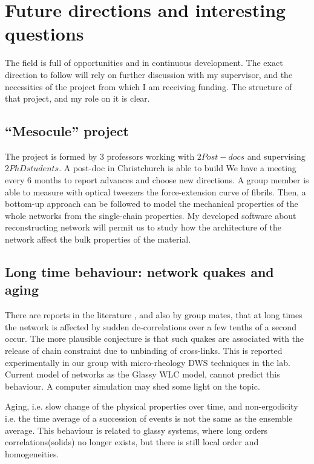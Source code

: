 \section{Future directions and interesting questions}

The field is full of opportunities and in continuous development. The exact
direction to follow will rely on further discussion with my supervisor, and the necessities
of the project from which I am receiving funding. The structure of that project,
and my role on it is clear.

\subsection{``Mesocule'' project}
The project is formed by $3$ professors working with $2 Post-docs$
and supervising $2 PhD students$. A post-doc in Christchurch is able to build We
have a meeting every $6$ months to report advances and choose new directions. A group
member is able to measure with optical tweezers the force-extension curve of
fibrils. Then, a bottom-up approach can be
followed\citep{schuster_investigating_2012} to model the mechanical properties of the
 whole networks from the single-chain properties. My developed software about
 reconstructing network will permit us to study how the architecture of the
 network affect the bulk properties of the
 material.



\subsection{Long time behaviour: network quakes and aging}
There are reports in the literature \citep{kajiya_slow_2013}, and also by group
mates, that at long times the network is affected by sudden de-correlations over
a few tenths of a second occur. The more plausible conjecture is that such quakes are associated with the release of chain constraint due to unbinding of
cross-links. This is reported experimentally in our group with micro-rheology
DWS techniques in the lab. Current model of networks as the Glassy WLC model,
cannot predict this behaviour. A computer simulation may shed some light on the
topic.

Aging, i.e. slow change of the physical properties over time, and non-ergodicity
i.e. the time average of a succession of events is not the same as the
ensemble average. This behaviour is related to glassy systems, where long
orders correlations(solids) no longer exists, but there is still local order and
homogeneities.\citep{cipelletti_slow_????}

